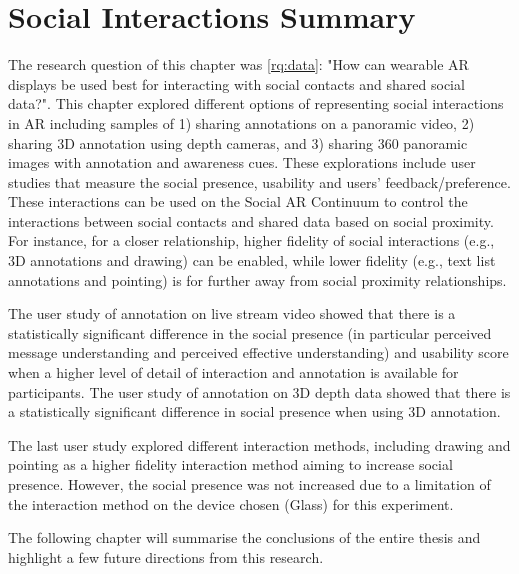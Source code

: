 \pagebreak
\section{Social Interactions Summary}

The research question of this chapter was \ref{rq:data}: "How can wearable AR displays be used best for interacting with social contacts and shared social data?". This chapter explored different options of representing social interactions in AR including samples of 1) sharing annotations on a panoramic video, 2) sharing 3D annotation using depth cameras, and 3) sharing 360 panoramic images with annotation and awareness cues. These explorations include user studies that measure the social presence, usability and users' feedback/preference. These interactions can be used on the Social AR Continuum to control the interactions between social contacts and shared data based on social proximity. For instance, for a closer relationship, higher fidelity of social interactions (e.g., 3D annotations and drawing) can be enabled, while lower fidelity (e.g., text list annotations and pointing) is for further away from social proximity relationships.

The user study of annotation on live stream video showed that there is a statistically significant difference in the social presence (in particular perceived message understanding and perceived effective understanding) and usability score when a higher level of detail of interaction and annotation is available for participants. The user study of annotation on 3D depth data showed that there is a statistically significant difference in social presence when using 3D annotation. 

The last user study explored different interaction methods, including drawing and pointing as a higher fidelity interaction method aiming to increase social presence. However, the social presence was not increased due to a limitation of the interaction method on the device chosen (Glass) for this experiment.

The following chapter will summarise the conclusions of the entire thesis and highlight a few future directions from this research.
